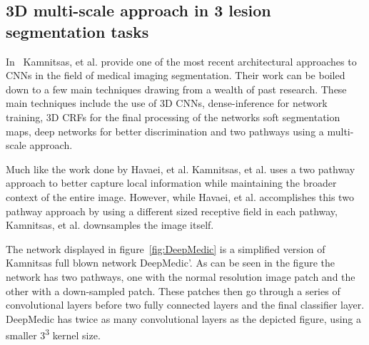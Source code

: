 \documentclass{sig-alternate}
\begin{document}
\subsection{3D multi-scale approach in 3 lesion segmentation tasks}
\label{sec:3DMultiScale}

In~\cite{Kamnitsas:2017} Kamnitsas, et al. provide one of the most recent architectural approaches to CNNs in the field of medical imaging segmentation. Their work can be boiled down to a few main techniques drawing from a wealth of past research. These main techniques include the use of 3D CNNs, dense-inference for network training, 3D CRFs for the final processing of the networks soft segmentation maps, deep networks for better discrimination and two pathways using a multi-scale approach.

Much like the work done by Havaei, et al. Kamnitsas, et al. uses a two pathway approach to better capture local information while maintaining the broader context of the entire image. However, while Havaei, et al. accomplishes this two pathway approach by using a different sized receptive field in each pathway, Kamnitsas, et al. downsamples the image itself.


\begin{figure*}
\centering
{}
\caption{The basic neural network architecture used by Kamnitsas, et al. in~\cite{Kamnitsas:2017}}
\label{fig:DeepMedic}
\end{figure*}

The network displayed in figure~\ref{fig:DeepMedic} is a simplified version of Kamnitsas full blown network DeepMedic'. As can be seen in the figure the network has two pathways, one with the normal resolution image patch and the other with a down-sampled patch. These patches then go through a series of convolutional layers before two fully connected layers and the final classifier layer. DeepMedic has twice as many convolutional layers as the depicted figure, using a smaller 3\textsuperscript{3} kernel size.
\end{document}
